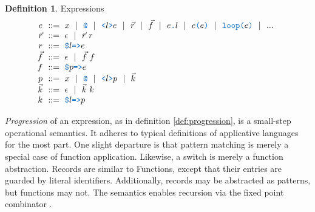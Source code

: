 \documentclass[acmsmall]{acmart}
\theoremstyle{definition}
\newtheorem{definition}{Definition}[section]
\begin{document}
\begin{definition} Expressions
  \label{def:expressions}
  \[\begin{array}[t]{r@{}l}
    \nonterm{e} 
    & 
    \is 
    \begin{array}[t]{@{}l}
      x \sep 
      \obj{@} \sep
      \obj{<}l\obj{>}e \sep 
      \vec{r} \sep
      \vec{f} \sep 
      e\obj{.}l \sep
      e\obj{(}e\obj{)} \sep
      \obj{loop(}e\obj{)} \sep
      ...
    \end{array}
    \\
    \nonterm{\vec{r}} & \is \epsilon \sep \vec{r}\ r 
    \\
    \nonterm{r} & \is \obj{\$}l\obj{=>}e
    \\
    \nonterm{\vec{f}} & \is \epsilon \sep \vec{f}\ f
    \\
    \nonterm{f} & \is \obj{\$}p\obj{=>}e
    \\
    \nonterm{p} & \is 
      x \sep
      \obj{@} \sep
      \obj{<}l\obj{>}p \sep
      \vec{k}
    \\
    \nonterm{\vec{k}} & \is \epsilon \sep \vec{k}\ k
    \\
    \nonterm{k} & \is \obj{\$}l\obj{=>}p
  \end{array}\]
\end{definition}

\emph{Progression} of an expression, as in definition \ref{def:progression},
is a small-step operational semantics. 
It adheres to typical definitions of applicative languages for the most part. One 
slight departure is that pattern matching is merely a special case of function application. 
Likewise, a switch is merely a function abstraction.
Records are similar to Functions, except that their entries are guarded by literal identifiers. 
Additionally, records may be abstracted as patterns, but functions may not.
The semantics enables recursion via the fixed point combinator .
\end{document}
